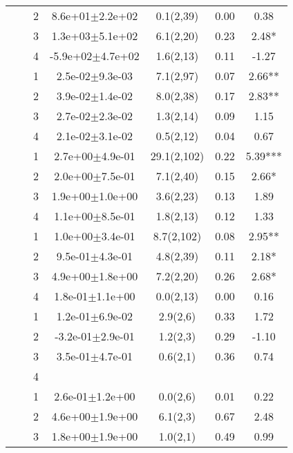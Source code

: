 \begin{longtable}[H]{llccccS[table-format=-2.2, table-space-text-post = {***}]}
   &  & 2 &  8.6e+01$\pm$2.2e+02 & 0.1(2,39) & 0.00 & 0.38 \\* 
   &  & 3 &  1.3e+03$\pm$5.1e+02 & 6.1(2,20) & 0.23 & 2.48* \\* 
   &  & 4 & -5.9e+02$\pm$4.7e+02 & 1.6(2,13) & 0.11 & -1.27 \\ 
   \midrule
{} & {} & 1 &  2.5e-02$\pm$9.3e-03 & 7.1(2,97) & 0.07 & 2.66** \\* 
   &  & 2 &  3.9e-02$\pm$1.4e-02 & 8.0(2,38) & 0.17 & 2.83** \\* 
   &  & 3 &  2.7e-02$\pm$2.3e-02 & 1.3(2,14) & 0.09 & 1.15 \\* 
   &  & 4 &  2.1e-02$\pm$3.1e-02 & 0.5(2,12) & 0.04 & 0.67 \\ 
   \midrule
{} & {} & 1 &  2.7e+00$\pm$4.9e-01 & 29.1(2,102) & 0.22 & 5.39*** \\* 
   &  & 2 &  2.0e+00$\pm$7.5e-01 & 7.1(2,40) & 0.15 & 2.66* \\* 
   &  & 3 &  1.9e+00$\pm$1.0e+00 & 3.6(2,23) & 0.13 & 1.89 \\* 
   &  & 4 &  1.1e+00$\pm$8.5e-01 & 1.8(2,13) & 0.12 & 1.33 \\ 
   \midrule
{} & {} & 1 &  1.0e+00$\pm$3.4e-01 & 8.7(2,102) & 0.08 & 2.95** \\* 
   &  & 2 &  9.5e-01$\pm$4.3e-01 & 4.8(2,39) & 0.11 & 2.18* \\* 
   &  & 3 &  4.9e+00$\pm$1.8e+00 & 7.2(2,20) & 0.26 & 2.68* \\* 
   &  & 4 &  1.8e-01$\pm$1.1e+00 & 0.0(2,13) & 0.00 & 0.16 \\ 
   \midrule
{} & {} & 1 &  1.2e-01$\pm$6.9e-02 & 2.9(2,6) & 0.33 & 1.72 \\* 
   &  & 2 & -3.2e-01$\pm$2.9e-01 & 1.2(2,3) & 0.29 & -1.10 \\* 
   &  & 3 &  3.5e-01$\pm$4.7e-01 & 0.6(2,1) & 0.36 & 0.74 \\* 
   &  & 4 &  &  &  &  \\ 
   \midrule
{} & {} & 1 &  2.6e-01$\pm$1.2e+00 & 0.0(2,6) & 0.01 & 0.22 \\* 
   &  & 2 &  4.6e+00$\pm$1.9e+00 & 6.1(2,3) & 0.67 & 2.48 \\* 
   &  & 3 &  1.8e+00$\pm$1.9e+00 & 1.0(2,1) & 0.49 & 0.99 \\* 

\end{longtable}
